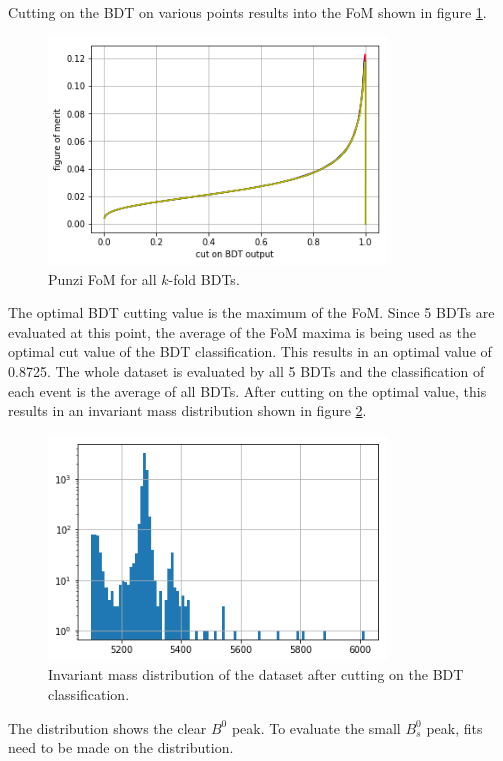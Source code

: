 Cutting on the BDT on various points results into the FoM shown in figure \ref{fig:FoM}.
\begin{figure}[!htb]
  \centering
  \includegraphics[width=0.8\textwidth]{plots/FoM.png}
  \caption{Punzi FoM for all $k$-fold BDTs.}
  \label{fig:FoM}
\end{figure}
The optimal BDT cutting value is the maximum of the FoM.
Since 5 BDTs are evaluated at this point, the average of the FoM maxima is being used as the optimal cut value of the BDT classification.
This results in an optimal value of 0.8725.
The whole dataset is evaluated by all 5 BDTs and the classification of each event is the average of all BDTs.
After cutting on the optimal value, this results in an invariant mass distribution shown in figure \ref{fig:BM_Data_afterBDT}.
\begin{figure}[!htb]
  \centering
  \includegraphics[width=0.8\textwidth]{plots/BM_Data_afterBDT.png}
  \caption{Invariant mass distribution of the dataset after cutting on the BDT classification.}
  \label{fig:BM_Data_afterBDT}
\end{figure}
The distribution shows the clear $B^0$ peak.
To evaluate the small $B^0_s$ peak, fits need to be made on the distribution.

